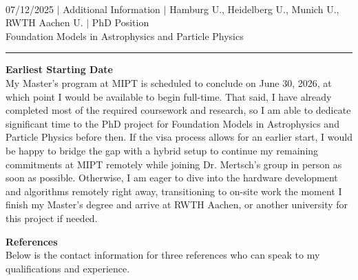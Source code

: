 \documentclass[a4paper,12pt]{article}
\begin{document}
\begin{center}
    {\Huge \scshape {\fontsize{25}{30}\selectfont{Reza}} {\fontsize{25}{30}}} \\ \vspace{3pt}
    {\small {07/12/2025}} $|$
    {\small {Additional Information}} $|$
    {\small {Hamburg U., Heidelberg U., Munich U., RWTH Aachen U.}} $|$
    {\small {PhD Position}} \\
    {\small {Foundation Models in Astrophysics and Particle Physics}}
    \vspace{-10pt}
\end{center}
\vspace{-10pt}
\noindent\rule{\textwidth}{0.5pt}

\vspace{10pt}

\textbf{Earliest Starting Date}\\
My Master's program at MIPT is scheduled to conclude on June 30, 2026, at which point I would be available to begin full-time. That said, I have already completed most of the required coursework and research, so I am able to dedicate significant time to the PhD project for Foundation Models in Astrophysics and Particle Physics before then. If the visa process allows for an earlier start, I would be happy to bridge the gap with a hybrid setup to continue my remaining commitments at MIPT remotely while joining Dr. Mertsch's group in person as soon as possible. Otherwise, I am eager to dive into the hardware development and algorithms remotely right away, transitioning to on-site work the moment I finish my Master's degree and arrive at RWTH Aachen, or another university for this project if needed.

\vspace{20pt}

\textbf{References}\\
Below is the contact information for three references who can speak to my qualifications and experience.

\vspace{10pt}
\end{document}
